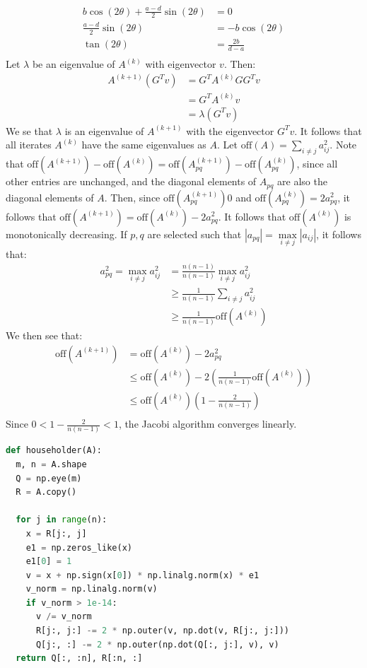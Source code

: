 \documentclass{article}
\begin{document}
\begin{align*}
    b\cos(2\theta) + \frac{a-d}{2}\sin(2\theta) & = 0 \\
    \frac{a-d}{2}\sin(2\theta) & = -b\cos(2\theta) \\
    \tan(2\theta) & = \frac{2b}{d - a} \\
\end{align*}
Let $\lambda$ be an eigenvalue of $A^{(k)}$ with eigenvector $v$. Then:
\begin{align*}
    A^{(k+1)}(G^Tv) & = G^TA^{(k)}GG^Tv \\
    & = G^TA^{(k)}v \\
    & = \lambda (G^Tv)
\end{align*}
We se that $\lambda$ is an eigenvalue of $A^{(k+1)}$ with the eigenvector $G^Tv$. It follows that all iterates $A^{(k)}$ have the same eigenvalues as $A$.
Let $\mathrm{off}(A) = \sum_{i\neq j} a_{ij}^2$. Note that $\mathrm{off}(A^{(k+1)}) - \mathrm{off}(A^{(k)}) = \mathrm{off}(A_{pq}^{(k+1)}) - \mathrm{off}(A_{pq}^{(k)})$, since all other entries are unchanged, and the diagonal elements of $A_{pq}$ are also the diagonal elements of $A$. Then, since $\mathrm{off}(A_{pq}^{(k+1)}) 0$ and $\mathrm{off}(A_{pq}^{(k)}) = 2a_{pq}^2$, it follows that $\mathrm{off}(A^{(k+1)}) = \mathrm{off}(A^{(k)}) - 2a_{pq}^2$. It follows that $\mathrm{off}(A^{(k)})$ is monotonically decreasing.
If $p, q$ are selected such that $|a_{pq}| = \underset{i \neq j}{\max} |a_{ij}|$, it follows that:
\begin{align*}
    a_{pq}^2 = \underset{i \neq j}{\max} a_{ij}^2 & = \frac{n(n - 1)}{n(n - 1)}\underset{i \neq j}{\max} a_{ij}^2 \\
    & \geq \frac{1}{n(n - 1)}\sum_{i \neq j} a_{ij}^2 \\
    & \geq \frac{1}{n(n - 1)}\mathrm{off}(A^{(k)})
\end{align*}
We then see that:
\begin{align*}
    \mathrm{off}(A^{(k+1)}) & = \mathrm{off}(A^{(k)}) - 2a_{pq}^2 \\
    & \leq \mathrm{off}(A^{(k)}) - 2\left(\frac{1}{n(n - 1)}\mathrm{off}(A^{(k)})\right) \\
    & \leq \mathrm{off}(A^{(k)})\left(1 - \frac{2}{n(n - 1)}\right) \\
\end{align*}
Since $0 < 1 - \frac{2}{n(n - 1)} < 1$, the Jacobi algorithm converges linearly.

\clearpage
\problem{}
\begin{lstlisting}[language=Python]
def householder(A):
  m, n = A.shape
  Q = np.eye(m)
  R = A.copy()

  for j in range(n):
    x = R[j:, j]
    e1 = np.zeros_like(x)
    e1[0] = 1
    v = x + np.sign(x[0]) * np.linalg.norm(x) * e1
    v_norm = np.linalg.norm(v)
    if v_norm > 1e-14:
      v /= v_norm
      R[j:, j:] -= 2 * np.outer(v, np.dot(v, R[j:, j:]))
      Q[j:, :] -= 2 * np.outer(np.dot(Q[:, j:], v), v)
  return Q[:, :n], R[:n, :]
\end{lstlisting}
\end{document}

